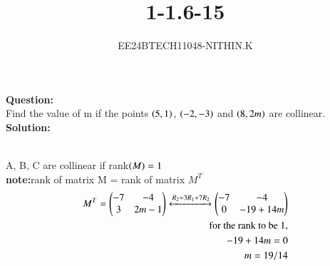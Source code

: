 \documentclass[journal]{IEEEtran}
\numberwithin{equation}{enumi}
\numberwithin{figure}{enumi}
\begin{document}


\title{1-1.6-15}
\author{EE24BTECH11048-NITHIN.K}
{\let\newpage\relax\maketitle}

\textbf{Question:} \\
Find the value of m if the points $\left(5, 1\right)$, $\left(-2, -3\right)$ and $\left(8, 2m\right)$ are collinear. \\
\textbf{Solution:} \\
\begin{table}[h!]    
      \centering
      
      \caption{}
\end{table} \\
A, B, C are collinear if rank$\left(M\right) = 1$ \\
\textbf{note:}rank of matrix M = rank of matrix $M^T$ \\
\begin{align}
	M^T = \begin{pmatrix}
		-7 & -4 \\
		3 & 2m-1\end{pmatrix}
	\xleftrightarrow{\substack{R_2 = 3R_1 + 7R_2}}
	\begin{pmatrix}
		-7 & -4 \\
		0 & -19+14m\end{pmatrix} \\
	\text{for the rank to be 1,} \\
	-19+14m=0 \\
	m=19/14
\end{align}
\end{document}
